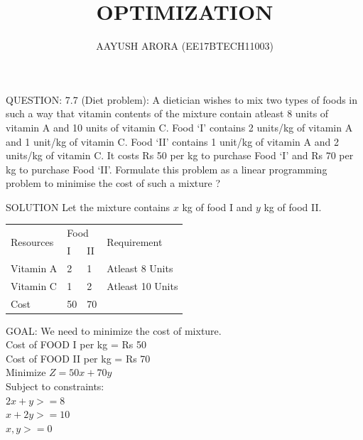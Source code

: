 \documentclass{beamer}
\title{OPTIMIZATION}
\author{AAYUSH ARORA (EE17BTECH11003) }
\begin{document}
\maketitle 
\begin{frame}{QUESTION: 7.7 }
(Diet problem): A dietician wishes to mix two types of foods in such a way that vitamin contents of the mixture contain atleast 8 units of vitamin A and 10 units of vitamin C. Food ‘I’ contains 2 units/kg of vitamin A and 1 unit/kg of vitamin C. Food ‘II’ contains 1 unit/kg of vitamin A and 2 units/kg of
vitamin C. It costs Rs 50 per kg to purchase Food ‘I’ and Rs 70 per kg to purchase Food ‘II’. Formulate this problem as a linear programming problem to minimise the cost of such a mixture ?
\end{frame}





\begin{frame}{SOLUTION}
Let the mixture contains $x$ kg of food I and $y$ kg of food II.
\\
\begin{table}[]
\begin{tabular}{|l|l|l|l|}
\hline
\multirow{2}{*}{Resources} & \multicolumn{2}{l|}{Food} & \multirow{2}{*}{Requirement} \\ \cline{2-3}
                           & I           & II          &                              \\ \hline
Vitamin A                  & 2           & 1           & Atleast 8 Units              \\ \hline
Vitamin C                  & 1           & 2           & Atleast 10 Units             \\ \hline
Cost                       & 50          & 70          &                              \\ \hline
\end{tabular}
\end{table}
\end{frame}



\begin{frame}{}
GOAL: We need to minimize the cost of mixture.\\
Cost of FOOD I per kg = Rs 50 \\
Cost of FOOD II per kg = Rs 70 \\
 Minimize $ Z = 50x +70y$\\
 Subject to constraints:\\
 $2x+y>=8$\\
 $x+2y>=10$\\
 $x,y>=0$\\
 \end{frame}
\end{document}
